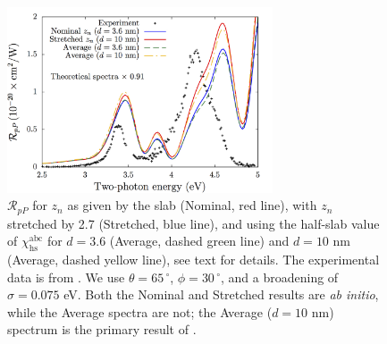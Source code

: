 \documentclass[utf8]{frontiersSCNS}
\begin{document}
\begin{figure}[b]
\centering 
\includegraphics[width=0.7\textwidth]{fig4}
\caption{$\mathcal{R}_{pP}$ for $z_{n}$ as given by the slab (Nominal, red
line), with $z_{n}$ stretched by 2.7 (Stretched, blue line), and using the
half-slab value of $\chi^{\mathrm{abc}}_{\mathrm{hs}}$ for $d = 3.6$ (Average,
dashed green line) and $d = 10$ nm (Average, dashed yellow line), see text for
details. The experimental data is from \cite{mejiaPRB02}. We use $\theta =
65\,^{\circ}$, $\phi = 30\,^{\circ}$, and a broadening of $\sigma = 0.075$ eV.
{\color{red}
Both the Nominal and Stretched results are \emph{ab initio}, while the Average
spectra are not; the Average ($d = 10$ nm) spectrum is the primary result of
\cite{andersonPRB16b}.
}}
\label{fig:rpp}
\end{figure}
\end{document}
